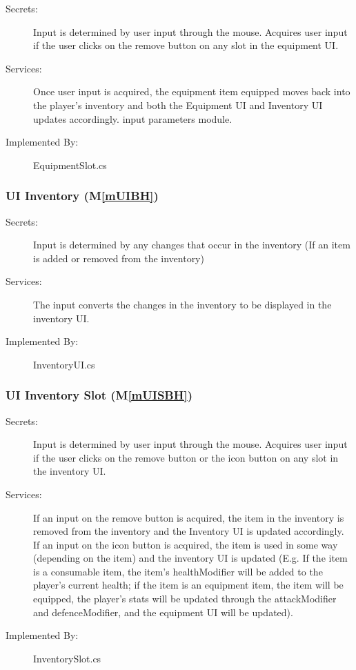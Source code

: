 \documentclass[12pt, titlepage]{article}
\newcommand{\mref}[1]{M\ref{#1}}
\begin{document}
\begin{description}
\item[Secrets:] Input is determined by user input through the mouse. Acquires user input if the user clicks on the remove button on any slot in the equipment UI.
\item[Services:] Once user input is acquired, the equipment item equipped moves back into the player's inventory and both the Equipment UI and Inventory UI updates accordingly.
  input parameters module.
\item[Implemented By:] EquipmentSlot.cs
\end{description}

\subsubsection{UI Inventory (\mref{mUIBH})}

\begin{description}
\item[Secrets:] Input is determined by any changes that occur in the inventory (If an item is added or removed from the inventory) 
\item[Services:] The input converts the changes in the inventory to be displayed in the inventory UI.
\item[Implemented By:] InventoryUI.cs
\end{description}

\subsubsection{UI Inventory Slot (\mref{mUISBH})}

\begin{description}
\item[Secrets:] Input is determined by user input through the mouse. Acquires user input if the user clicks on the remove button or the icon button on any slot in the inventory UI.
\item[Services:] If an input on the remove button is acquired, the item in the inventory is removed from the inventory and the Inventory UI is updated accordingly. If an input on the icon button is acquired, the item is used in some way (depending on the item) and the inventory UI is updated (E.g. If the item is a consumable item, the item's healthModifier will be added to the player's current health; if the item is an equipment item, the item will be equipped, the player's stats will be updated through the attackModifier and defenceModifier,  and the equipment UI will be updated).
\item[Implemented By:] InventorySlot.cs
\end{description}
\end{document}

